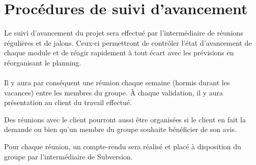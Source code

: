 \documentclass[a4paper,11pt,french]{article}
\begin{document}
\section{Procédures de suivi d'avancement}
Le suivi d'avancement du projet sera effectué par l'intermédiaire de réunions
régulières et de jalons. Ceux-ci permettront de contrôler l'état d'avancement
de chaque module et de réagir rapidement à tout écart avec les prévisions en
réorganisant le planning.

\paragraph{}
Il y aura par conséquent une réunion chaque semaine (hormis durant les
vacances) entre les membres du groupe. À chaque validation, il y aura
présentation au client du travail effectué.

Des réunions avec le client pourront aussi être organisées si le client en fait
la demande ou bien qu'un membre du groupe souhaite bénéficier de son avis.

Pour chaque réunion, un compte-rendu sera réalisé et placé à disposition du
groupe par l'intermédiaire de Subversion.
\end{document}
